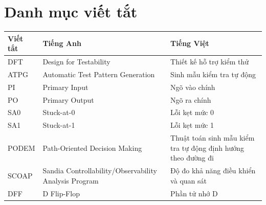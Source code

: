 \documentclass[12pt,a4paper,oneside]{report}
\newif\ifcoverborder
\begin{document}
\hypersetup{pageanchor=false}
\coverbordertrue

\coverborderfalse


\hypersetup{pageanchor=true}
\tableofcontents
\clearpage
\chapter*{Danh mục viết tắt}
\begin{longtable}{@{}>{\raggedright\arraybackslash}p{2.4cm}%
  >{\raggedright\arraybackslash}p{6.2cm}>{\raggedright\arraybackslash}p{5.6cm}@{}}
\toprule
Viết tắt & Tiếng Anh & Tiếng Việt \\
\midrule
\endhead
DFT & Design for Testability & Thiết kế hỗ trợ kiểm thử \\
ATPG & Automatic Test Pattern Generation & Sinh mẫu kiểm tra tự động \\
PI & Primary Input & Ngõ vào chính \\
PO & Primary Output & Ngõ ra chính \\
SA0 & Stuck-at-0 & Lỗi kẹt mức 0 \\
SA1 & Stuck-at-1 & Lỗi kẹt mức 1 \\
PODEM & Path-Oriented Decision Making & Thuật toán sinh mẫu kiểm tra tự động định hướng theo đường đi \\
SCOAP & Sandia Controllability/Observability Analysis Program & Độ đo khả năng điều khiển và quan sát \\
DFF & D Flip-Flop & Phần tử nhớ D \\
\bottomrule
\end{longtable}
\clearpage










\clearpage
\begingroup
\setlength{\emergencystretch}{1em}
\printbibliography[heading=bibintoc,title={Tài liệu tham khảo}]
\endgroup
\end{document}
